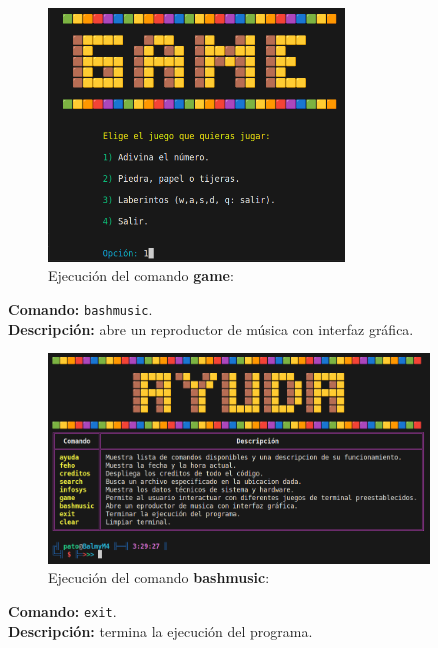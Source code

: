 \documentclass[titlepage]{article}
\begin{document}
\begin{figure}[H]
    \centering
    \includegraphics[width=0.7\textwidth]{game.png}
    \caption{Ejecución del comando \textbf{game}:}
    \label{fig:ejemplo}
\end{figure}

\noindent
\textbf{Comando:} \verb|bashmusic|. \\
\textbf{Descripción:} abre un reproductor de música con interfaz gráfica.          

\begin{figure}[H]
    \centering
    \includegraphics[width=0.9\textwidth]{ayuda.png}
    \caption{Ejecución del comando \textbf{bashmusic}:}
    \label{fig:ejemplo}
\end{figure}

\noindent
\textbf{Comando:} \verb|exit|. \\
\textbf{Descripción:} termina la ejecución del programa.           
\end{document}
